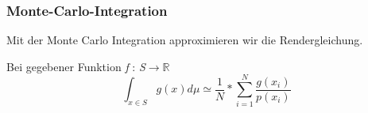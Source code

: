 \subsubsection{Monte-Carlo-Integration}
Mit der Monte Carlo Integration approximieren wir die Rendergleichung.\par 
Bei gegebener Funktion \textit{f }:\textit{ S}$\rightarrow \mathbb{R}$ 
\cite{KK02}
\label{pic:MonteCarloIntegration}
\begin{equation}
    \int_{x\in S} g(x) d\mu \simeq \frac{1}{N}*\sum_{i=1}^{N}\frac{g(x_i)}{p(x_i)}
\end{equation}
    


